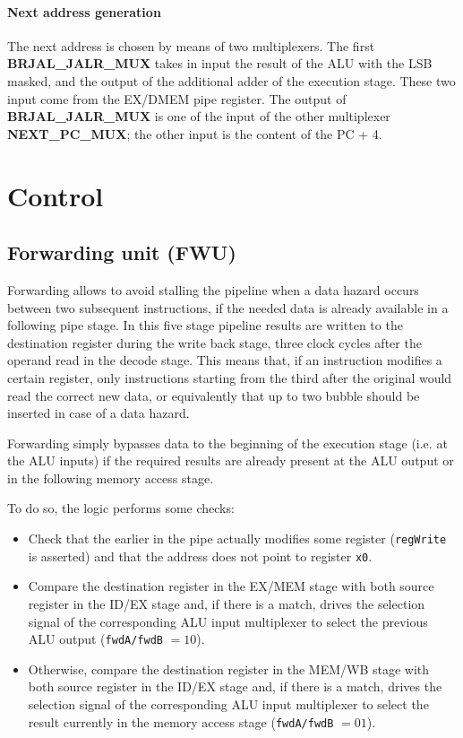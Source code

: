 \documentclass[a4paper]{article}
\begin{document}
\paragraph{Next address generation}
The next address is chosen by means of two multiplexers. The first \textbf{BRJAL\_JALR\_MUX} takes in input the result of the ALU with the LSB masked, and the output of the additional adder of the execution stage. These two input come from the EX/DMEM pipe register. The output of \textbf{BRJAL\_JALR\_MUX} is one of the input of the other multiplexer \textbf{NEXT\_PC\_MUX}; the other input is the content of the PC + 4.

\section{Control}
\subsection{Forwarding unit (FWU)}
Forwarding allows to avoid stalling the pipeline when a data hazard occurs between two subsequent instructions, if the needed data is already available in a following pipe stage. 
In this five stage pipeline results are written to the destination register during the write back stage, three clock cycles after the operand read in the decode stage. This means that, if an instruction modifies a certain register, only instructions starting from the third after the original would read the correct new data, or equivalently that up to two bubble should be inserted in case of a data hazard.

Forwarding simply bypasses data to the beginning of the execution stage (i.e. at the ALU inputs) if the required results are already present at the ALU output or in the following memory access stage. 

To do so, the logic performs some checks:
\begin{itemize}
    \item Check that the earlier in the pipe actually modifies some register (\texttt{regWrite} is asserted) and that the address does not point to register \texttt{x0}.
    \item Compare the destination register in the EX/MEM stage with both source register in the ID/EX stage and, if there is a match, drives the selection signal of the corresponding ALU input multiplexer to select the previous ALU output (\texttt{fwdA/fwdB} $= 10$).
    \item Otherwise, compare the destination register in the MEM/WB stage with both source register in the ID/EX stage and, if there is a match, drives the selection signal of the corresponding ALU input multiplexer to select the result currently in the memory access stage (\texttt{fwdA/fwdB} $= 01$).
\end{itemize}
\end{document}
